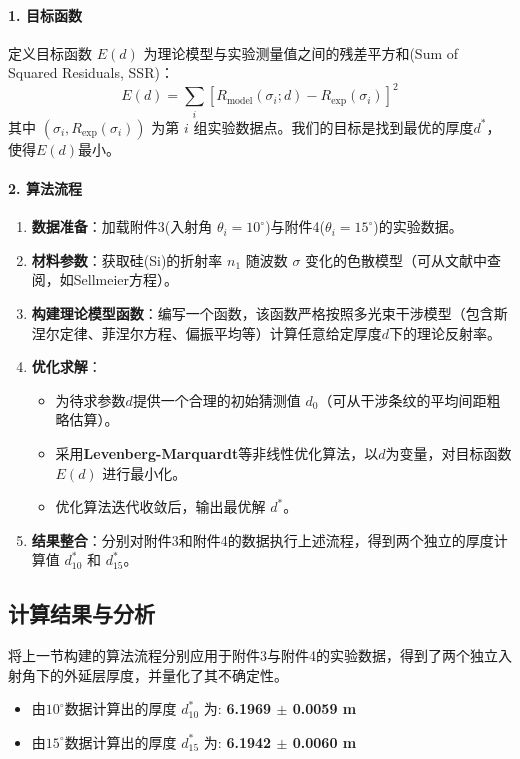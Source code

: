 \documentclass[withoutpreface,bwprint]{cumcmthesis} %
\begin{document}
\paragraph{1. 目标函数}
定义目标函数 $E(d)$ 为理论模型与实验测量值之间的残差平方和(Sum of Squared Residuals, SSR)：
\begin{equation}
    E(d) = \sum_i \left[ R_{\text{model}}(\sigma_i; d) - R_{\text{exp}}(\sigma_i) \right]^2
\end{equation}
其中 $(\sigma_i, R_{\text{exp}}(\sigma_i))$ 为第 $i$ 组实验数据点。我们的目标是找到最优的厚度$d^*$，使得$E(d)$最小。

\paragraph{2. 算法流程}
\begin{enumerate}
    \item \textbf{数据准备}：加载附件3(入射角 $\theta_i=10^\circ$)与附件4($\theta_i=15^\circ$)的实验数据。
    \item \textbf{材料参数}：获取硅(Si)的折射率 $n_1$ 随波数 $\sigma$ 变化的色散模型（可从文献中查阅，如Sellmeier方程\cite{Sellmeier}）。
    \item \textbf{构建理论模型函数}：编写一个函数，该函数严格按照多光束干涉模型（包含斯涅尔定律、菲涅尔方程、偏振平均等）计算任意给定厚度$d$下的理论反射率。
    \item \textbf{优化求解}：
        \begin{itemize}
            \item 为待求参数$d$提供一个合理的初始猜测值 $d_0$（可从干涉条纹的平均间距粗略估算）。
            \item 采用\textbf{Levenberg-Marquardt}\cite{LM算法}等非线性优化算法，以$d$为变量，对目标函数 $E(d)$ 进行最小化。
            \item 优化算法迭代收敛后，输出最优解 $d^*$。
        \end{itemize}
    \item \textbf{结果整合}：分别对附件3和附件4的数据执行上述流程，得到两个独立的厚度计算值 $d_{10}^*$ 和 $d_{15}^*$。
\end{enumerate}

\subsection{计算结果与分析}
将上一节构建的算法流程分别应用于附件3与附件4的实验数据，得到了两个独立入射角下的外延层厚度，并量化了其不确定性。

\begin{itemize}
    \item 由$10^\circ$数据计算出的厚度 $d_{10}^*$ 为: \textbf{6.1969 $\pm$ 0.0059 \textmu m}
    \item 由$15^\circ$数据计算出的厚度 $d_{15}^*$ 为: \textbf{6.1942 $\pm$ 0.0060 \textmu m}
\end{itemize}
\end{document}
